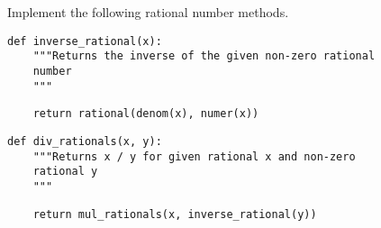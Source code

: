 \question Implement the following rational number methods.
\begin{lstlisting}
def inverse_rational(x):
    """Returns the inverse of the given non-zero rational 
    number
    """
\end{lstlisting}
\begin{solution} [0.5in]
\begin{lstlisting}
    return rational(denom(x), numer(x))
\end{lstlisting}
\end{solution}
\begin{lstlisting}
def div_rationals(x, y):
    """Returns x / y for given rational x and non-zero
    rational y
    """
\end{lstlisting}
\begin{solution} [0.5in]
\begin{lstlisting}
    return mul_rationals(x, inverse_rational(y))
\end{lstlisting}
\end{solution}
